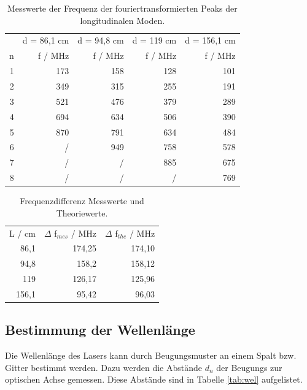 \begin{table}[H]
  \centering
  \footnotesize
  \caption{Messwerte der Frequenz der fouriertransformierten Peaks der longitudinalen Moden.}
  \label{tab:lon}
  \begin{tabular}{r r r r r}
  \toprule
      & d = 86,1 \: cm & d = 94,8 \: cm & d = 119 \: cm & d = 156,1 \: cm  \\
    n & f / MHz & f / MHz  & f / MHz & f / MHz \\
  \midrule
    1 & 173 & 158 & 128 & 101 \\
    2 & 349 & 315 & 255 & 191 \\
    3 & 521 & 476 & 379 & 289 \\
    4 & 694 & 634 & 506 & 390 \\
    5 & 870 & 791 & 634 & 484 \\
    6 & /   & 949 & 758 & 578 \\
    7 & /   & /   & 885 & 675 \\
    8 & /   & /   & /   & 769 \\
  \bottomrule
  \end{tabular}
\end{table}


\begin{table}[H]
  \centering
  \footnotesize
  \caption{Frequenzdifferenz Messwerte und Theoriewerte.}
  \label{tab:lon2}
  \begin{tabular}{r r r}
  \toprule
    L / cm & $\Delta$ f$_{mes}$ / MHz & $\Delta$ f$_{the}$ / MHz \\
      86,1 & 174,25 & 174,10 \\
      94,8 & 158,2  & 158,12 \\
      119  & 126,17 & 125,96 \\
      156,1& 95,42  & 96,03  \\
  \bottomrule
  \end{tabular}
\end{table}



\subsection{Bestimmung der Wellenlänge}
\label{sec:Bestimmung der Wellenlänge}
Die Wellenlänge des Lasers kann durch Beugungsmuster an einem Spalt bzw. Gitter bestimmt werden. 
Dazu werden die Abstände $d_n$ der Beugungs zur optischen Achse gemessen.
Diese Abstände sind in Tabelle \ref{tab:wel} aufgelistet.

